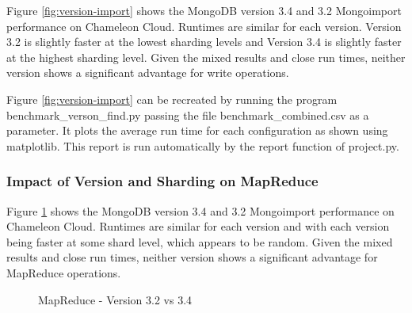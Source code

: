 \documentclass[9pt,twocolumn,twoside]{../../styles/osajnl}
\begin{document}
Figure \ref{fig:version-import} shows the MongoDB version 3.4 and 3.2 Mongoimport performance on Chameleon Cloud. Runtimes are similar for each version.  Version 3.2 is slightly faster at the lowest sharding levels and Version 3.4 is slightly faster at the highest sharding level.  Given the mixed results and close run times, neither version shows a significant advantage for write operations.

Figure \ref{fig:version-import} can be recreated by running the program benchmark\_verson\_find.py passing the file benchmark\_combined.csv as a parameter.  It plots the average run time for each configuration as shown using matplotlib.  This report is run automatically by the report function of project.py.



\subsubsection{Impact of Version and Sharding on MapReduce}

Figure \ref{fig:version-mapreduce} shows the MongoDB version 3.4 and 3.2 Mongoimport performance on Chameleon Cloud.  Runtimes are similar for each version and with each version being faster at some shard level, which appears to be random. Given the mixed results and close run times, neither version shows a significant advantage for MapReduce operations.

\begin{figure}[htbp]
\centering
{}
\caption{MapReduce - Version 3.2 vs 3.4}
\label{fig:version-mapreduce}
\end{figure}
\end{document}
